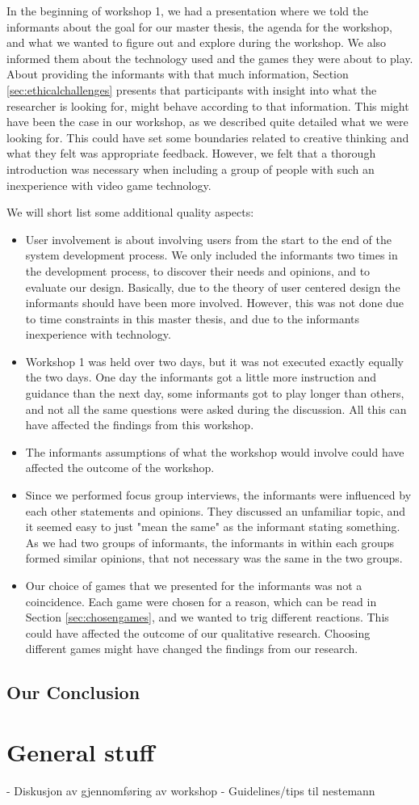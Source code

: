 In the beginning of workshop 1, we had a presentation where we told the informants about the goal for our master thesis, the agenda for the workshop, and what we wanted to figure out and explore during the workshop. We also informed them about the technology used and the games they were about to play. About providing the informants with that much information, Section \ref{sec:ethicalchallenges} presents that participants with insight into what the researcher is looking for, might behave according to that information. This might have been the case in our workshop, as we described quite detailed what we were looking for. This could have set some boundaries related to creative thinking and what they felt was appropriate feedback. However, we felt that a thorough introduction was necessary when including a group of people with such an inexperience with video game technology. 

We will short list some additional quality aspects: 
\begin{itemize}
\renewcommand{\labelitemi}{$\bullet$}
\item User involvement is about involving users from the start to the end of the system development process. We only included the informants two times in the development process, to discover their needs and opinions, and to evaluate our design. Basically, due to the theory of user centered design the informants should have been more involved. However, this was not done due to time constraints in this master thesis, and due to the informants inexperience with technology. 
\item Workshop 1 was held over two days, but it was not executed exactly equally the two days. One day the informants got a little more instruction and guidance than the next day, some informants got to play longer than others, and not all the same questions were asked during the discussion. All this can have affected the findings from this workshop. 
\item The informants assumptions of what the workshop would involve could have affected the outcome of the workshop. 
\item Since we performed focus group interviews, the informants were influenced by each other statements and opinions. They discussed an unfamiliar topic, and it seemed easy to just "mean the same" as the informant stating something. As we had two groups of informants, the informants in within each groups formed similar opinions, that not necessary was the same in the two groups.   
\item Our choice of games that we presented for the informants was not a coincidence. Each game were chosen for a reason, which can be read in Section \ref{sec:chosengames}, and we wanted to trig different reactions. This could have affected the outcome of our qualitative research. Choosing different games might have changed the findings from our research. 
\end{itemize}

\subsection{Our Conclusion}

\section{General stuff}
- Diskusjon av gjennomføring av workshop
- Guidelines/tips til nestemann

